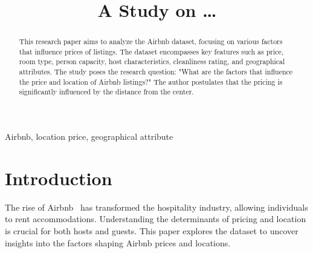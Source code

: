\documentclass[10pt, conference, compsocconf]{IEEEtran}
\begin{document}
\title{A Study on \dots}

\author{
}
\maketitle


\begin{abstract}
This research paper aims to analyze the Airbnb dataset, focusing on various factors that influence prices of listings. 
The dataset encompasses key features such as price, room type, person capacity, host characteristics, cleanliness rating, and geographical attributes. 
The study poses the research question: "What are the factors that influence the price and location of Airbnb listings?" 
The author postulates that the pricing is significantly influenced by the distance from the center.

\lipsum[1]
\end{abstract}

\begin{IEEEkeywords}
Airbnb, location price, geographical attribute
\end{IEEEkeywords}

\section{Introduction}
The rise of Airbnb~\cite{andreu2020airbnb} has transformed the hospitality industry, allowing individuals to rent accommodations. 
Understanding the determinants of pricing and location is crucial for both hosts and guests. 
This paper explores the dataset to uncover insights into the factors shaping Airbnb prices and locations.

\lipsum[2-3]

\lipsum[3-4]

\lipsum[5-6]
\end{document}
